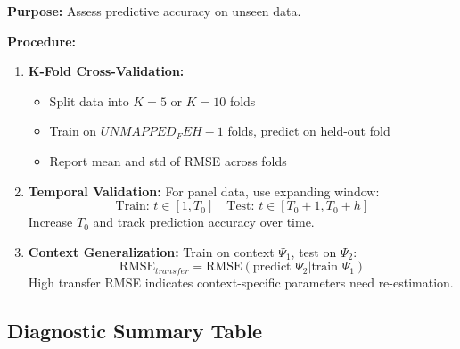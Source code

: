 \begin{tcolorbox}[colback=gray!5!white, colframe=gray!75!black,
    title=Diagnostic Protocol AZ-V4: Cross-Validation]
\textbf{Purpose:} Assess predictive accuracy on unseen data.

\textbf{Procedure:}
\begin{enumerate}[nosep]
\item \textbf{K-Fold Cross-Validation:}
\begin{itemize}[nosep]
\item Split data into $K = 5$ or $K = 10$ folds
\item Train on $UNMAPPED_FEH-1$ folds, predict on held-out fold
\item Report mean and std of RMSE across folds
\end{itemize}

\item \textbf{Temporal Validation:}
For panel data, use expanding window:
\begin{equation}
\text{Train: } t \in [1, T_0] \quad \text{Test: } t \in [T_0+1, T_0+h]
\end{equation}
Increase $T_0$ and track prediction accuracy over time.

\item \textbf{Context Generalization:}
Train on context $\Psi_1$, test on $\Psi_2$:
\begin{equation}
\text{RMSE}_{transfer} = \text{RMSE}(\text{predict } \Psi_2 | \text{train } \Psi_1)
\end{equation}
High transfer RMSE indicates context-specific parameters need re-estimation.
\end{enumerate}
\end{tcolorbox}

\subsection{Diagnostic Summary Table}

